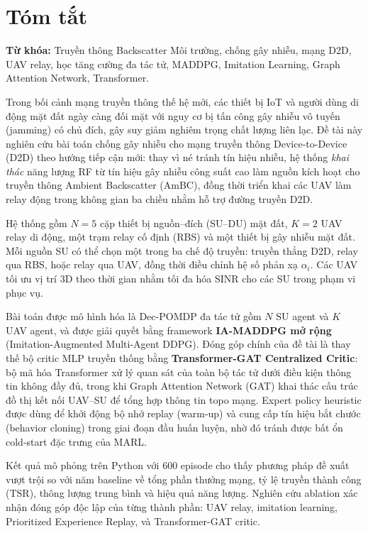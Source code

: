 \chapter*{Tóm tắt}

\noindent
\textbf{Từ khóa:} Truyền thông Backscatter Môi trường, chống gây nhiễu, mạng D2D, UAV relay,
học tăng cường đa tác tử, MADDPG, Imitation Learning, Graph Attention Network, Transformer.

\bigskip

Trong bối cảnh mạng truyền thông thế hệ mới, các thiết bị IoT và người dùng di động mặt đất
ngày càng đối mặt với nguy cơ bị tấn công gây nhiễu vô tuyến (jamming) có chủ đích, gây suy
giảm nghiêm trọng chất lượng liên lạc. Đề tài này nghiên cứu bài toán chống gây nhiễu cho mạng
truyền thông Device-to-Device (D2D) theo hướng tiếp cận mới: thay vì né tránh tín hiệu nhiễu,
hệ thống \emph{khai thác} năng lượng RF từ tín hiệu gây nhiễu công suất cao làm nguồn kích
hoạt cho truyền thông Ambient Backscatter (AmBC), đồng thời triển khai các UAV làm relay
động trong không gian ba chiều nhằm hỗ trợ đường truyền D2D.

Hệ thống gồm $N = 5$ cặp thiết bị nguồn--đích (SU--DU) mặt đất, $K = 2$ UAV relay di động,
một trạm relay cố định (RBS) và một thiết bị gây nhiễu mặt đất. Mỗi nguồn SU có thể chọn
một trong ba chế độ truyền: truyền thẳng D2D, relay qua RBS, hoặc relay qua UAV, đồng thời
điều chỉnh hệ số phản xạ $\alpha_i$. Các UAV tối ưu vị trí 3D theo thời gian nhằm tối đa hóa
SINR cho các SU trong phạm vi phục vụ.

Bài toán được mô hình hóa là Dec-POMDP đa tác tử gồm $N$ SU agent và $K$ UAV agent, và được
giải quyết bằng framework \textbf{IA-MADDPG mở rộng} (Imitation-Augmented Multi-Agent DDPG).
Đóng góp chính của đề tài là thay thế bộ critic MLP truyền thống bằng
\textbf{Transformer-GAT Centralized Critic}: bộ mã hóa Transformer xử lý quan sát của toàn
bộ tác tử dưới điều kiện thông tin không đầy đủ, trong khi Graph Attention Network (GAT) khai
thác cấu trúc đồ thị kết nối UAV--SU để tổng hợp thông tin topo mạng. Expert policy heuristic
được dùng để khởi động bộ nhớ replay (warm-up) và cung cấp tín hiệu bắt chước (behavior
cloning) trong giai đoạn đầu huấn luyện, nhờ đó tránh được bất ổn cold-start đặc trưng của
MARL.

Kết quả mô phỏng trên Python với 600 episode cho thấy phương pháp đề xuất vượt trội so với
năm baseline về tổng phần thưởng mạng, tỷ lệ truyền thành công (TSR), thông lượng trung
bình và hiệu quả năng lượng. Nghiên cứu ablation xác nhận đóng góp độc lập của từng thành
phần: UAV relay, imitation learning, Prioritized Experience Replay, và Transformer-GAT critic.

